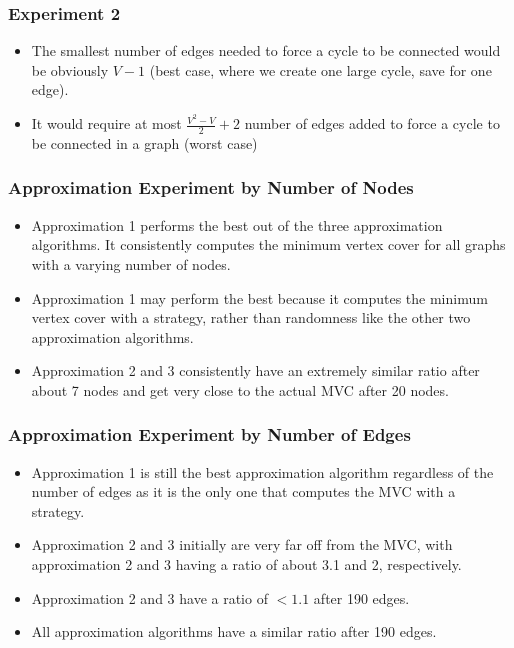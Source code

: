 \documentclass[12pt]{article}
\begin{document}
\subsubsection{Experiment 2}
\begin{itemize}
    \item The smallest number of edges needed to force a cycle to be connected would be obviously $V-1$ (best case, where we create one large cycle, save for one edge).
    \item It would require at most $\frac{V^2 - V}{2} + 2$ number of edges added to force a cycle to be connected in a graph (worst case) 
  \end{itemize}

  \subsubsection{Approximation Experiment by Number of Nodes}

  \begin{itemize}
      \item Approximation 1 performs the best out of the three approximation algorithms. It consistently computes the minimum vertex cover for all graphs with a varying number of nodes.
      \item Approximation 1 may perform the best because it computes the minimum vertex cover with a strategy, rather than randomness like the other two approximation algorithms.
      \item Approximation 2 and 3 consistently have an extremely similar ratio after about 7 nodes and get very close to the actual MVC after 20 nodes.
  \end{itemize}
  
  \subsubsection{Approximation Experiment by Number of Edges}
  
  \begin{itemize}
      \item Approximation 1 is still the best approximation algorithm regardless of the number of edges as it is the only one that computes the MVC with a strategy.
      \item Approximation 2 and 3 initially are very far off from the MVC, with approximation 2 and 3 having a ratio of about 3.1 and 2, respectively.
      \item Approximation 2 and 3 have a ratio of $<1.1$ after 190 edges.
      \item All approximation algorithms have a similar ratio after 190 edges.
  \end{itemize}
  
\end{document}
